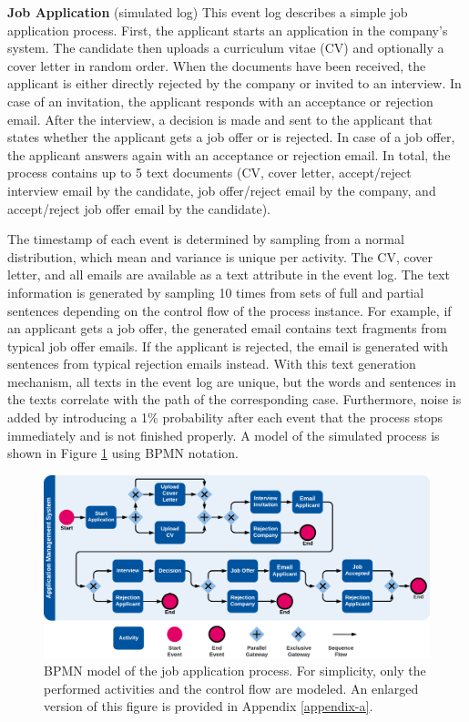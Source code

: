 \textbf{Job Application} (simulated log) This event log describes a simple job application process. 
First, the applicant starts an application in the company’s system.
The candidate then uploads a curriculum vitae (CV) and optionally a cover letter in random order.
When the documents have been received, the applicant is either directly rejected by the company or invited to an interview.
In case of an invitation, the applicant responds with an acceptance or rejection email.
After the interview, a decision is made and sent to the applicant that states whether the applicant gets a job offer or is rejected.
In case of a job offer, the applicant answers again with an acceptance or rejection email.
In total, the process contains up to 5 text documents (CV, cover letter, accept/reject interview email by the candidate, job offer/reject email by the company, and accept/reject job offer email by the candidate).

The timestamp of each event is determined by sampling from a normal distribution, which mean and variance is unique per activity.
The CV, cover letter, and all emails are available as a text attribute in the event log.
The text information is generated by sampling 10 times from sets of full and partial sentences depending on the control flow of the process instance.
For example, if an applicant gets a job offer, the generated email contains text fragments from typical job offer emails.
If the applicant is rejected, the email is generated with sentences from typical rejection emails instead.
With this text generation mechanism, all texts in the event log are unique, but the words and sentences in the texts correlate with the path of the corresponding case.
Furthermore, noise is added by introducing a 1\% probability after each event that the process stops immediately and is not finished properly.
A model of the simulated process is shown in Figure \ref{fig:/application-process} using BPMN \cite{BPMN} notation.

\begin{figure}[htbp!]
	\centering
	\includegraphics[width=\textwidth]{figures/application-process}
	\caption[BPMN model of the job application process]{BPMN model of the job application process. For simplicity, only the performed activities and the control flow are modeled. An enlarged version of this figure is provided in Appendix \ref{appendix-a}.}
	\label{fig:/application-process}
\end{figure}

